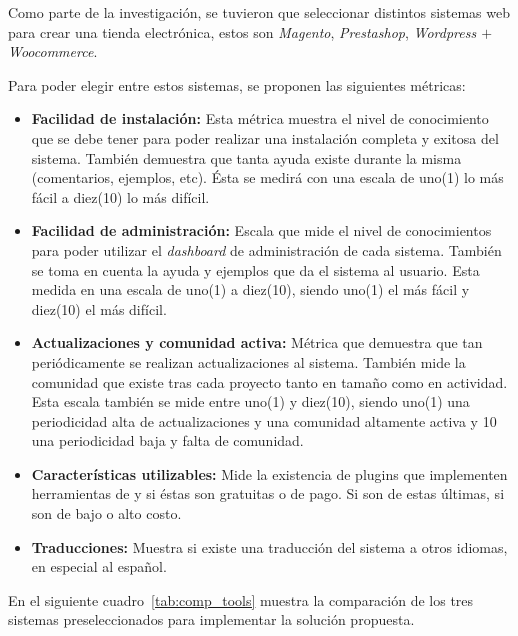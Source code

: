 Como parte de la investigación, se tuvieron que seleccionar distintos sistemas web para
crear una tienda electrónica, estos son \emph{Magento}, \emph{Prestashop}, \emph{Wordpress
$+$ Woocommerce}.

Para poder elegir entre estos sistemas, se proponen las siguientes métricas:

\begin{itemize}

    \item {\bf Facilidad de instalación:}
        Esta métrica muestra el nivel de conocimiento que se debe
        tener para poder realizar una instalación completa y exitosa del sistema.
        También demuestra que tanta ayuda existe durante la misma (comentarios,
        ejemplos, etc).
        Ésta se medirá con una escala de uno(1) lo más fácil a diez(10) lo más difícil.

    \item {\bf Facilidad de administración:}
        Escala que mide el nivel de conocimientos para poder utilizar el
        \emph{dashboard} de administración de cada sistema.
        También se toma en cuenta la ayuda y ejemplos que da el sistema al usuario.
        Esta medida en una escala de uno(1) a diez(10), siendo uno(1) el más fácil y diez(10) 
	el más difícil.

    \item {\bf Actualizaciones y comunidad activa:}
        Métrica que demuestra que tan periódicamente se realizan actualizaciones
        al sistema.
        También mide la comunidad que existe tras cada proyecto tanto en tamaño
        como en actividad.
        Esta escala también se mide entre uno(1) y diez(10), siendo uno(1) una periodicidad 
	alta de actualizaciones y una comunidad altamente activa
	y 10 una periodicidad baja y falta de comunidad.

    \item {\bf Características utilizables:}
        Mide la existencia de plugins que implementen herramientas de {\GAM}
        y si éstas son gratuitas o de pago.
        Si son de estas últimas, si son de bajo o alto costo.

    \item {\bf Traducciones:}
        Muestra si existe una traducción del sistema a otros idiomas, en especial
        al español.

\end{itemize}

En el siguiente cuadro~\ref{tab:comp_tools} muestra la comparación de los tres
sistemas preseleccionados para implementar la solución propuesta.

